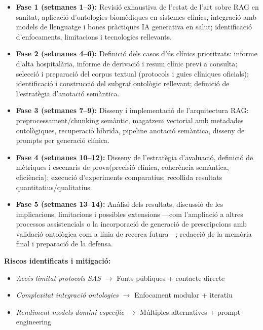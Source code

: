 \documentclass[CAT]{TFUOC}%
\begin{document}
\begin{itemize}
    \item \textbf{Fase 1 (setmanes 1--3):}
    Revisió exhaustiva de l'estat de l'art sobre RAG en sanitat, aplicació d'ontologies biomèdiques en sistemes clínics, integració amb models de llenguatge i bones pràctiques IA generativa en salut; identificació d'enfocaments, limitacions i tecnologies rellevants.
    
    \item \textbf{Fase 2 (setmanes 4--6):} Definició dels casos d'ús clínics prioritzats: informe d'alta hospitalària, informe de derivació i resum clínic previ a consulta; selecció i preparació del corpus textual (protocols i guies clíniques oficials); identificació i construcció del subgraf ontològic rellevant; definició de l'estratègia d'anotació semàntica.

    \item \textbf{Fase 3 (setmanes 7--9):} Disseny i implementació de l'arquitectura RAG: preprocessament/chunking semàntic, magatzem vectorial amb metadades ontològiques, recuperació híbrida, pipeline anotació semàntica, disseny de prompts per generació clínica.
      
    \item \textbf{Fase 4 (setmanes 10--12):} Disseny de l'estratègia d'avaluació, definició de mètriques i escenaris de prova(precisió clínica, coherència semàntica, eficiència); execució d'experiments comparatius; recollida resultats quantitatius/qualitatius.

    \item \textbf{Fase 5 (setmanes 13--14):} Anàlisi dels resultats, discussió de les implicacions, limitacions i possibles extensions ---com l'ampliació a altres processos assistencials o la incorporació de generació de prescripcions amb validació ontològica com a línia de recerca futura---; redacció de la memòria final i preparació de la defensa.
  
\end{itemize}

\textbf{Riscos identificats i mitigació:}
\begin{itemize}
\item \textit{Accés limitat protocols SAS} $\to$ Fonts públiques + contacte directe
\item \textit{Complexitat integració ontologies} $\to$ Enfocament modular + iteratiu
\item \textit{Rendiment models domini específic} $\to$ Múltiples alternatives + prompt engineering
\end{itemize}
\end{document}
